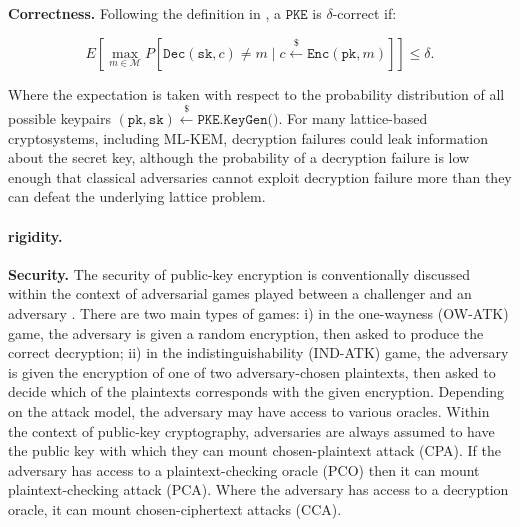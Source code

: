\documentclass[runningheads]{llncs}
\newcommand{\pke}{\texttt{PKE}}
\newcommand{\encrypt}{\texttt{Enc}}
\newcommand{\decrypt}{\texttt{Dec}}
\newcommand{\pk}{\texttt{pk}}
\newcommand{\sk}{\texttt{sk}}
\newcommand{\leftsample}{\stackrel{\$}{\leftarrow}}
\begin{document}
\textbf{Correctness.} Following the definition in \cite{DBLP:conf/eurocrypt/DworkNR04}, a $\pke$ is $\delta$-correct if:

\begin{equation*}
    E\left[\max_{m \in \mathcal{M}} P\left[\decrypt(\sk, c) \neq m \mid c \leftsample \encrypt(\pk, m)\right]\right] \leq \delta.
\end{equation*}

Where the expectation is taken with respect to the probability distribution of all possible keypairs $(\pk, \sk) \leftsample \texttt{PKE.KeyGen()}$. For many lattice-based cryptosystems, including ML-KEM, decryption failures could leak information about the secret key, although the probability of a decryption failure is low enough that classical adversaries cannot exploit decryption failure more than they can defeat the underlying lattice problem.

\paragraph{rigidity.} %

\textbf{Security.} The security of public-key encryption is conventionally discussed within the context of adversarial games played between a challenger and an adversary \cite{DBLP:conf/stoc/GoldwasserM82}. There are two main types of games: i) in the one-wayness (OW-ATK) game, the adversary is given a random encryption, then asked to produce the correct decryption; ii) in the indistinguishability (IND-ATK) game, the adversary is given the encryption of one of two adversary-chosen plaintexts, then asked to decide which of the plaintexts corresponds with the given encryption. Depending on the attack model, the adversary may have access to various oracles. Within the context of public-key cryptography, adversaries are always assumed to have the public key with which they can mount chosen-plaintext attack (CPA). If the adversary has access to a plaintext-checking oracle (PCO) \cite{DBLP:conf/ctrsa/OkamotoP01} then it can mount plaintext-checking attack (PCA). Where the adversary has access to a decryption oracle, it can mount chosen-ciphertext attacks (CCA). 
\end{document}
